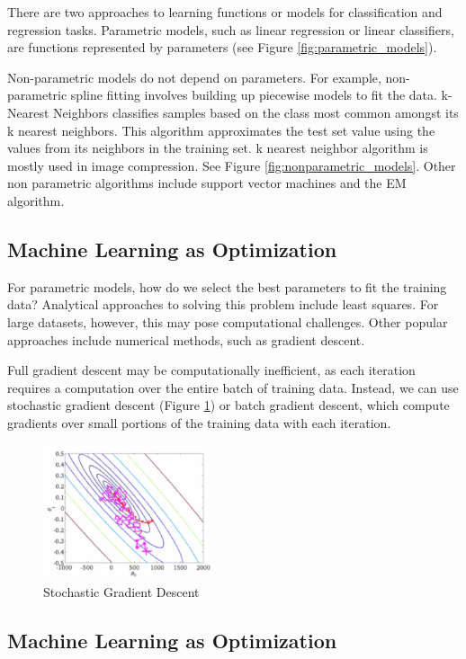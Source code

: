 \documentclass[twoside]{article}
\begin{document}
There are two approaches to learning functions or models for classification and regression tasks. Parametric models, such as linear regression or linear classifiers, are functions represented by parameters (see Figure \ref{fig:parametric_models}).

Non-parametric models do not depend on parameters. For example, non-parametric spline fitting involves building up piecewise models to fit the data. k-Nearest Neighbors classifies samples based on the class most common amongst its k nearest neighbors. This algorithm approximates the test set value using the values from its neighbors in the training set. k nearest neighbor algorithm is mostly used in image compression. See Figure \ref{fig:nonparametric_models}. Other non parametric algorithms include support vector machines and the EM algorithm. 


\subsection{Machine Learning as Optimization}

For parametric models, how do we select the best parameters to fit the training data? Analytical approaches to solving this problem include least squares. For large datasets, however, this may pose computational challenges. Other popular approaches include numerical methods, such as gradient descent.

Full gradient descent may be computationally inefficient, as each iteration requires a computation over the entire batch of training data. Instead, we can use stochastic gradient descent (Figure \ref{fig:sgd}) or batch gradient descent, which compute gradients over small portions of the training data with each iteration. 

\begin{figure}[!ht]%
    \centering
    \includegraphics[width=5cm]{sgd}
    \caption{Stochastic Gradient Descent}
    \label{fig:sgd}%
\end{figure}

\subsection{Machine Learning as Optimization}
\end{document}
